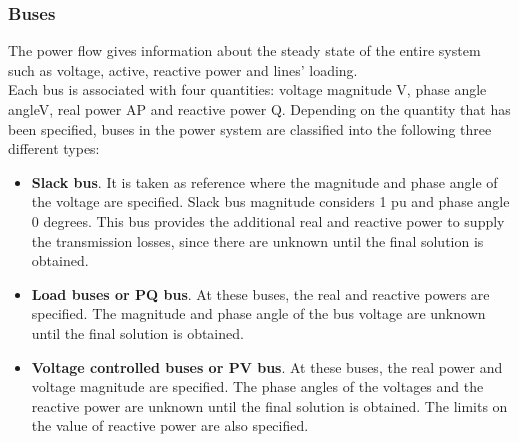 \subsubsection{Buses}
The power flow gives information about the steady state of the entire system such as voltage, active, reactive power and lines' loading.\\
Each bus is associated with four quantities: voltage magnitude \gls{V}, phase angle \gls{angleV}, real power \gls{AP} and reactive power \gls{Q}.
Depending on the quantity that has been specified, buses in the power system are classified into the following three different types:
\begin{itemize}
    \item \textbf{Slack bus}. It is taken as reference where the magnitude and phase angle of the voltage are specified. Slack bus magnitude considers 1 \gls{pu} and phase angle 0 degrees. This bus provides the additional real and reactive power to supply the transmission losses, since there are unknown until the final solution is obtained.

    \item \textbf{Load buses or PQ bus}. At these buses, the real and reactive powers are specified. The magnitude and phase angle of the bus voltage are unknown until the final solution is obtained.

    \item \textbf{Voltage controlled buses or PV bus}. At these buses, the real power and voltage magnitude are specified. The phase angles of the voltages and the reactive power are unknown until the final solution is obtained. The limits on the value of reactive power are also specified. 
\end{itemize}

